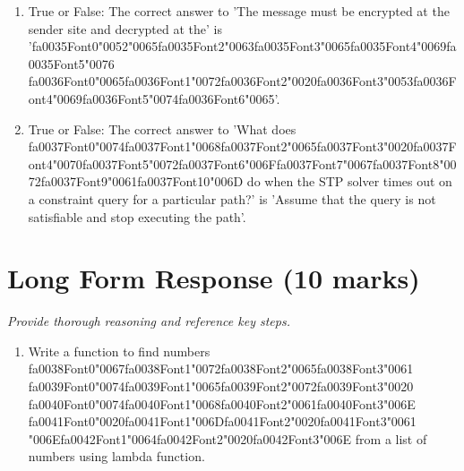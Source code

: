 \documentclass[12pt]{article}
\begin{document}
\begin{enumerate}[label=\arabic*.]
\item True or False: The correct answer to 'The message must be encrypted at the sender site and decrypted at the' is '{\csname fa0035Font0\endcsname\char"0052}{\char"0065}{\csname fa0035Font2\endcsname\char"0063}{\csname fa0035Font3\endcsname\char"0065}{\csname fa0035Font4\endcsname\char"0069}{\csname fa0035Font5\endcsname\char"0076} {\csname fa0036Font0\endcsname\char"0065}{\csname fa0036Font1\endcsname\char"0072}{\csname fa0036Font2\endcsname\char"0020}{\csname fa0036Font3\endcsname\char"0053}{\csname fa0036Font4\endcsname\char"0069}{\csname fa0036Font5\endcsname\char"0074}{\csname fa0036Font6\endcsname\char"0065}'.
\item True or False: The correct answer to 'What does {\csname fa0037Font0\endcsname\char"0074}{\csname fa0037Font1\endcsname\char"0068}{\csname fa0037Font2\endcsname\char"0065}{\csname fa0037Font3\endcsname\char"0020}{\csname fa0037Font4\endcsname\char"0070}{\csname fa0037Font5\endcsname\char"0072}{\csname fa0037Font6\endcsname\char"006F}{\csname fa0037Font7\endcsname\char"0067}{\csname fa0037Font8\endcsname\char"0072}{\csname fa0037Font9\endcsname\char"0061}{\csname fa0037Font10\endcsname\char"006D} do when the STP solver times out on a constraint query for a particular path?' is 'Assume that the query is not satisfiable and stop executing the path'.
\end{enumerate}

\section*{Long Form Response (10 marks)}
\textit{Provide thorough reasoning and reference key steps.}
\begin{enumerate}[label=\arabic*.]
\item Write a function to find numbers {\csname fa0038Font0\endcsname\char"0067}{\csname fa0038Font1\endcsname\char"0072}{\csname fa0038Font2\endcsname\char"0065}{\csname fa0038Font3\endcsname\char"0061} {\csname fa0039Font0\endcsname\char"0074}{\csname fa0039Font1\endcsname\char"0065}{\csname fa0039Font2\endcsname\char"0072}{\csname fa0039Font3\endcsname\char"0020} {\csname fa0040Font0\endcsname\char"0074}{\csname fa0040Font1\endcsname\char"0068}{\csname fa0040Font2\endcsname\char"0061}{\csname fa0040Font3\endcsname\char"006E} {\csname fa0041Font0\endcsname\char"0020}{\csname fa0041Font1\endcsname\char"006D}{\csname fa0041Font2\endcsname\char"0020}{\csname fa0041Font3\endcsname\char"0061} {\char"006E}{\csname fa0042Font1\endcsname\char"0064}{\csname fa0042Font2\endcsname\char"0020}{\csname fa0042Font3\endcsname\char"006E} from a list of numbers using lambda
function.
\end{enumerate}
\end{document}
